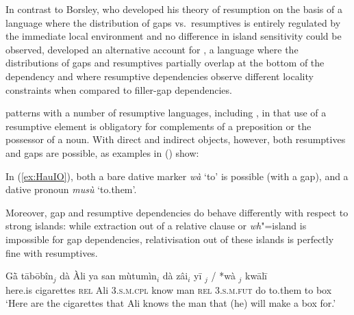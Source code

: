 \documentclass[output=paper
,notxmath 
	        ,collection
	        ,collectionchapter
 	        ,biblatex
                ,babelshorthands
                ,newtxmath
                ,draftmode
                ,colorlinks, citecolor=brown
]{langscibook}
\begin{document}
In contrast to Borsley, who developed his theory of resumption on the
basis of a language where the distribution of gaps vs.\ resumptives is
entirely regulated by the immediate local environment and no
difference in island sensitivity could be observed,
\citet{Crysmann:12} developed an alternative account for , a
language where the distributions of gaps and resumptives partially
overlap at the bottom of the dependency and where resumptive
dependencies observe different locality constraints when compared to
filler-gap dependencies.

 patterns with a number of resumptive languages, including , in that use of a
resumptive element is obligatory for
complements of a preposition or the possessor of a noun. With direct and indirect objects, however,
both resumptives and gaps are possible, as  examples in () show: 

\eal
\label{ex:HauIO}
\zl


\noindent
In (\ref{ex:HauIO}), both a bare dative marker \textit{wà} `to' is
possible (with a gap), and a dative pronoun \textit{musù} `to.them'.

Moreover, gap and resumptive dependencies do behave differently with
respect to strong islands: while extraction out of a relative clause
or \emph{wh}"=island is impossible for gap dependencies,
relativisation out of these islands is perfectly fine with
resumptives.

\ea
\label{ex:HauResLongIO}
\gll Gā̀      tābōbîn$_j$ dà          Àli ya                 san  mùtumìn$_i$ dà           zâi$_i$            yī $_j$ /  *{wà \trace{}$_j$}   kwālī\footnotemark\\
     here.is cigarettes \textsc{rel} Ali \textsc{3.s.m.cpl} know man         \textsc{rel} \textsc{3.s.m.fut} do to.them           {} \hphantom{*}to     box\\
    \glt `Here are the cigarettes that Ali knows the man that (he) will make a box for.'
\z
\end{document}
